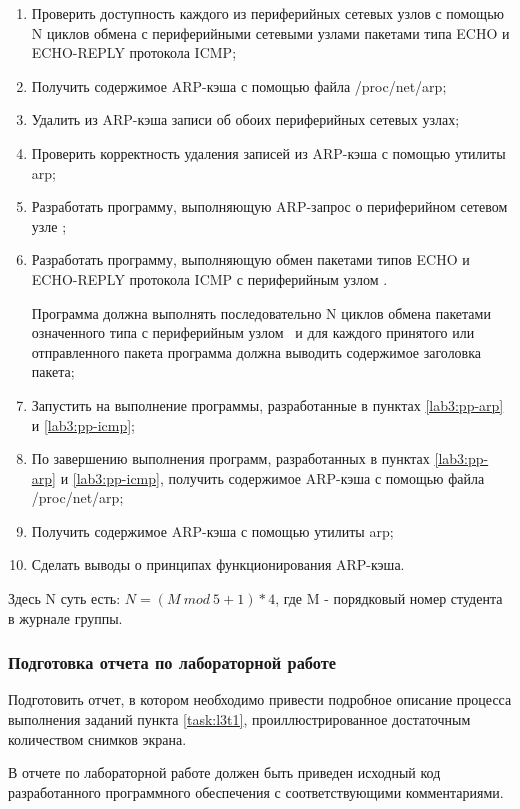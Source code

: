 	\begin{enumerate}

		\item Проверить доступность каждого из периферийных сетевых узлов с помощью N циклов обмена с периферийными
		сетевыми узлами пакетами типа ECHO и ECHO-REPLY протокола ICMP;

		\item Получить содержимое ARP-кэша с помощью файла /proc/net/arp;

		\item Удалить из ARP-кэша записи об обоих периферийных сетевых узлах;

		\item Проверить корректность удаления записей из ARP-кэша с помощью утилиты arp;

		\item Разработать программу, выполняющую ARP-запрос о периферийном сетевом узле \linebreak \first;\label{lab3:pp-arp}

		\item Разработать программу, выполняющую обмен пакетами типов ECHO и ECHO-REPLY протокола ICMP с периферийным
		узлом \second.\label{lab3:pp-icmp}
		
		Программа должна выполнять последовательно N циклов обмена пакетами означенного типа с
		периферийным узлом \second\ и для каждого принятого или отправленного пакета программа должна выводить
		содержимое заголовка пакета;

		\item Запустить на выполнение программы, разработанные в пунктах \ref{lab3:pp-arp} и \ref{lab3:pp-icmp};

		\item По завершению выполнения программ, разработанных в пунктах \ref{lab3:pp-arp} и \ref{lab3:pp-icmp},
		получить содержимое ARP-кэша с помощью файла /proc/net/arp;

		\item Получить содержимое ARP-кэша с помощью утилиты arp;

		\item Сделать выводы о принципах функционирования ARP-кэша.

	\end{enumerate}

	Здесь N суть есть: $N = (M~mod~5 + 1) * 4$, где M - порядковый номер студента в журнале группы.

\subsubsection{Подготовка отчета по лабораторной работе}

	Подготовить отчет, в котором необходимо привести подробное описание процесса выполнения заданий пункта
	\ref{task:l3t1}, проиллюстрированное достаточным количеством снимков экрана.

	В отчете по лабораторной работе должен быть приведен исходный код разработанного программного обеспечения с
	соответствующими комментариями.

